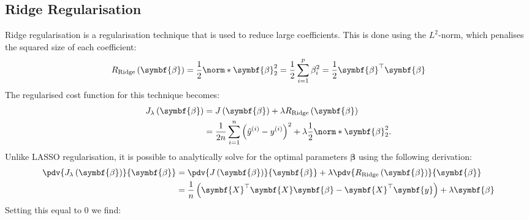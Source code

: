 \documentclass{article}
\begin{document}
\subsection{Ridge Regularisation}
Ridge regularisation is a regularisation technique that is used to
reduce large coefficients. This is done using the \(L^2\)-norm, which
penalises the squared size of each coefficient:
\begin{equation*}
    R_{\mathrm{Ridge}}\left( \symbf{\beta} \right) = \frac{1}{2} \norm*{\symbf{\beta}}_2^2 = \frac{1}{2} \sum_{i = 1}^p \beta_i^2 = \frac{1}{2} \symbf{\beta}^\top \symbf{\beta}
\end{equation*}
The regularised cost function for this technique becomes:
\begin{align*}
    J_{\lambda}\left( \symbf{\beta} \right) & = J\left( \symbf{\beta} \right) + \lambda R_{\mathrm{Ridge}}\left( \symbf{\beta} \right)                                                            \\
                                            & = \frac{1}{2n} \sum_{i = 1}^n {\left( \hat{y}^{\left( i \right)} - y^{\left( i \right)} \right)}^2 + \lambda \frac{1}{2} \norm*{\symbf{\beta}}_2^2.
\end{align*}
Unlike LASSO regularisation, it is possible to analytically solve for the
optimal parameters \(\symbf{\beta}\) using the following derivation:
\begin{align*}
    \pdv{J_{\lambda}\left( \symbf{\beta} \right)}{\symbf{\beta}} & = \pdv{J\left( \symbf{\beta} \right)}{\symbf{\beta}} + \lambda \pdv{R_{\mathrm{Ridge}}\left( \symbf{\beta} \right)}{\symbf{\beta}} \\
                                                                 & = \frac{1}{n} \left( \symbf{X}^\top \symbf{X} \symbf{\beta} - \symbf{X}^\top \symbf{y} \right) + \lambda \symbf{\beta}
\end{align*}
Setting this equal to 0 we find:
\end{document}
